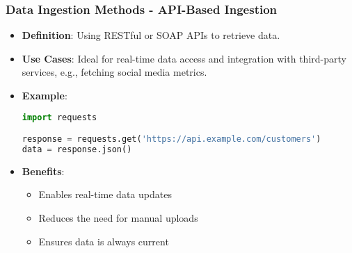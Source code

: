 \documentclass{beamer}
\begin{document}
\begin{frame}[fragile]
    \frametitle{Data Ingestion Methods - API-Based Ingestion}
    \begin{itemize}
        \item \textbf{Definition}: Using RESTful or SOAP APIs to retrieve data.
        \item \textbf{Use Cases}: Ideal for real-time data access and integration with third-party services, e.g., fetching social media metrics.
        \item \textbf{Example}:
        \begin{lstlisting}[language=Python]
import requests

response = requests.get('https://api.example.com/customers')
data = response.json()
        \end{lstlisting}
        \item \textbf{Benefits}:
        \begin{itemize}
            \item Enables real-time data updates
            \item Reduces the need for manual uploads
            \item Ensures data is always current
        \end{itemize}
    \end{itemize}
\end{frame}
\end{document}

